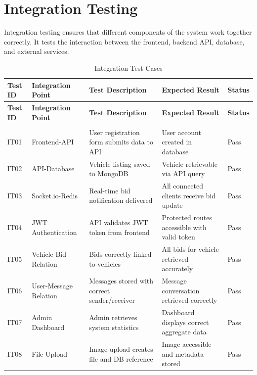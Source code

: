 \section{Integration Testing}

Integration testing ensures that different components of the system work together correctly. It tests the interaction between the frontend, backend API, database, and external services.

\begin{longtable}{|p{1.8cm}|p{2.8cm}|p{3.2cm}|p{3cm}|p{1cm}|}
    \hline
    \textbf{Test ID} & \textbf{Integration Point} & \textbf{Test Description} & \textbf{Expected Result} & \textbf{Status} \\
    \hline
    \endfirsthead

    \hline
    \textbf{Test ID} & \textbf{Integration Point} & \textbf{Test Description} & \textbf{Expected Result} & \textbf{Status} \\
    \hline
    \endhead

    \hline
    \endfoot

    \hline
    \caption{Integration Test Cases} \label{tab:integration_tests} \\
    \endlastfoot

    IT01 & Frontend-API & User registration form submits data to API & User account created in database & Pass \\
    \hline
    IT02 & API-Database & Vehicle listing saved to MongoDB & Vehicle retrievable via API query & Pass \\
    \hline
    IT03 & Socket.io-Redis & Real-time bid notification delivered & All connected clients receive bid update & Pass \\
    \hline
    IT04 & JWT Authentication & API validates JWT token from frontend & Protected routes accessible with valid token & Pass \\
    \hline
    IT05 & Vehicle-Bid Relation & Bids correctly linked to vehicles & All bids for vehicle retrieved accurately & Pass \\
    \hline
    IT06 & User-Message Relation & Messages stored with correct sender/receiver & Message conversation retrieved correctly & Pass \\
    \hline
    IT07 & Admin Dashboard & Admin retrieves system statistics & Dashboard displays correct aggregate data & Pass \\
    \hline
    IT08 & File Upload & Image upload creates file and DB reference & Image accessible and metadata stored & Pass \\
\end{longtable}

